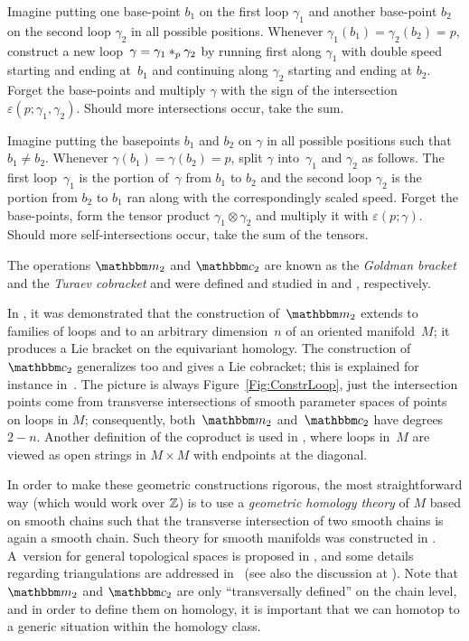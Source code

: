 \documentclass[\MainFolder/Text.tex]{subfiles}
\begin{document}
\begin{description}[leftmargin=*]
 \item[$\StringOp_2$:] Imagine putting one base-point $b_1$ on the first loop $\gamma_1$ and another base-point $b_2$ on the second loop $\gamma_2$ in all possible positions. Whenever $\gamma_1(b_1) = \gamma_2(b_2) = p$, construct a new loop~$\gamma = \gamma_1 *_p \gamma_2$ by running first along $\gamma_1$ with double speed starting and ending at~$b_1$ and continuing along $\gamma_2$ starting and ending at $b_2$. Forget the base-points and multiply $\gamma$ with the sign of the intersection $\varepsilon(p;\gamma_1, \gamma_2)$. Should more intersections occur, take the sum.
 \item[$\StringCoOp_2$:] Imagine putting the basepoints $b_1$ and $b_2$ on $\gamma$ in all possible positions such that $b_1 \neq b_2$. Whenever $\gamma(b_1) = \gamma(b_2)=p$, split $\gamma$ into~$\gamma_1$ and $\gamma_2$ as follows. The first loop~$\gamma_1$ is the portion of~$\gamma$ from $b_1$ to $b_2$ and the second loop $\gamma_2$ is the portion from $b_2$ to $b_1$ ran along with the correspondingly scaled speed. Forget the base-points, form the tensor product $\gamma_1 \otimes \gamma_2$ and multiply it with $\varepsilon(p; \gamma)$. Should more self-intersections occur, take the sum of the tensors.
\end{description}
The operations $\StringOp_2$ and $\StringCoOp_2$ are known as the \emph{Goldman bracket} and the \emph{Turaev cobracket} and were defined and studied in \cite{Goldman1986} and \cite{Turaev1991}, respectively.

In \cite{Sullivan1999}, it was demonstrated that the construction of~$\StringOp_2$ extends to families of loops and to an arbitrary dimension~$n$ of an oriented manifold~$M$; it produces a Lie bracket on the equivariant homology.
The construction of $\StringCoOp_2$ generalizes too and gives a Lie cobracket; this is explained for instance in~\cite{Cieliebak2007}. 
The picture is always Figure~\ref{Fig:ConstrLoop}, just the intersection points come from transverse intersections of smooth parameter spaces of points on loops in $M$; consequently, both~$\StringOp_2$ and~$\StringCoOp_2$ have degrees $2-n$.
Another definition of the coproduct is used in \cite{Basu2011}, where loops in~$M$ are viewed as open strings in $M\times M$ with endpoints at the diagonal.

In order to make these geometric constructions rigorous, the most straightforward way (which would work over $\mathbb{Z}$) is to use a \emph{geometric homology theory} of $M$ based on smooth chains such that the transverse intersection of two smooth chains is again a smooth chain.
Such theory for smooth manifolds was constructed in \cite{Lipyanskiy2014}.
A~version for general topological spaces is proposed in \cite{Cieliebak2013}, and some details regarding triangulations are addressed in~\cite{Hajek2014} (see also the discussion at \cite{MO157762}).
Note that $\StringOp_2$ and $\StringCoOp_2$ are only ``transversally defined'' on the chain level, and in order to define them on homology, it is important that we can homotop to a generic situation within the homology class.
\end{document}
